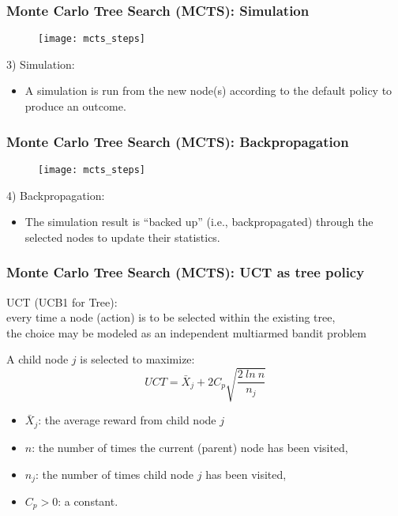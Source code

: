 \begin{frame}
\frametitle{Monte Carlo Tree Search (MCTS): Simulation}
\begin{figure}
    \centering
    \texttt{[image: mcts\_steps]}
\end{figure}

3) Simulation:
\small
\begin{itemize}
\item A simulation is run from the new node(s) according to the default policy to produce an outcome.
\end{itemize}
\end{frame}

\begin{frame}
\frametitle{Monte Carlo Tree Search (MCTS): Backpropagation}
\begin{figure}
    \centering
    \texttt{[image: mcts\_steps]}
\end{figure}

4) Backpropagation:
\small
\begin{itemize}
\item The simulation result is ``backed up'' (i.e., backpropagated) through the selected nodes to
update their statistics.
\end{itemize}
\end{frame}

\begin{frame}
\frametitle{Monte Carlo Tree Search (MCTS): UCT as tree policy}
UCT (UCB1 for Tree): \\
every time a node (action) is to be selected within the existing tree, \\
the choice may be modeled as an independent multiarmed bandit problem \\
\vspace{5mm}
\pause

A child node $j$ is selected to maximize:
\begin{equation*}
UCT = \bar{X}_j + 2 C_p \sqrt{\frac{2~ln~n}{n_j}}
\end{equation*}
\pause

\begin{itemize}
\item $\bar{X}_j$: the average reward from child node $j$ \pause
\item $n$: the number of times the current (parent) node has been visited, \pause
\item $n_j$: the number of times child node $j$ has been visited, \pause
\item $C_p > 0$: a constant.
\end{itemize}

\end{frame}